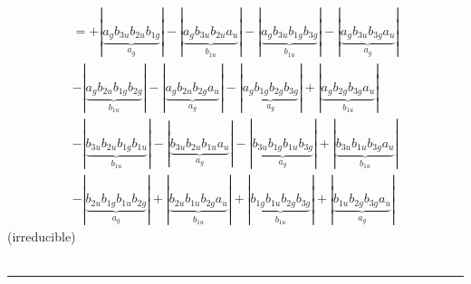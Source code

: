 \documentclass{article}
\begin{document}
\begin{multline*}
\end{multline*}\begin{multline*}
=+\left|\underbrace{a_{g} b_{3u} b_{2u} b_{1g}}_{a_{g}}\right|-\left|\underbrace{a_{g} b_{3u} b_{2u} a_{u}}_{b_{1u}}\right|-\left|\underbrace{a_{g} b_{3u} b_{1g} b_{3g}}_{b_{1u}}\right|-\left|\underbrace{a_{g} b_{3u} b_{3g} a_{u}}_{a_{g}}\right|\\
-\left|\underbrace{a_{g} b_{2u} b_{1g} b_{2g}}_{b_{1u}}\right|-\left|\underbrace{a_{g} b_{2u} b_{2g} a_{u}}_{a_{g}}\right|-\left|\underbrace{a_{g} b_{1g} b_{2g} b_{3g}}_{a_{g}}\right|+\left|\underbrace{a_{g} b_{2g} b_{3g} a_{u}}_{b_{1u}}\right|\\
-\left|\underbrace{b_{3u} b_{2u} b_{1g} b_{1u}}_{b_{1u}}\right|-\left|\underbrace{b_{3u} b_{2u} b_{1u} a_{u}}_{a_{g}}\right|-\left|\underbrace{b_{3u} b_{1g} b_{1u} b_{3g}}_{a_{g}}\right|+\left|\underbrace{b_{3u} b_{1u} b_{3g} a_{u}}_{b_{1u}}\right|\\
-\left|\underbrace{b_{2u} b_{1g} b_{1u} b_{2g}}_{a_{g}}\right|+\left|\underbrace{b_{2u} b_{1u} b_{2g} a_{u}}_{b_{1u}}\right|+\left|\underbrace{b_{1g} b_{1u} b_{2g} b_{3g}}_{b_{1u}}\right|+\left|\underbrace{b_{1u} b_{2g} b_{3g} a_{u}}_{a_{g}}\right|
\end{multline*}(irreducible)\\ \\
\hrule\newpage 
\end{document}
